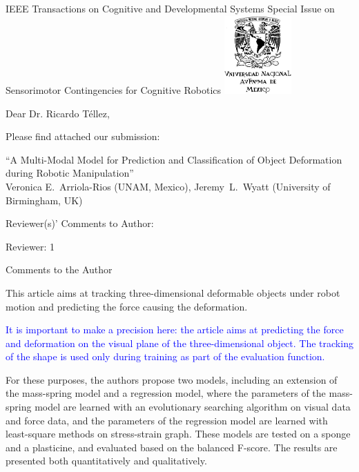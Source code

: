 \documentclass[a4paper,12pt]{letter}
\newcommand{\comment}[1]{\textcolor{blue}{#1}}
\begin{document}

\begin{letter}{IEEE Transactions on Cognitive and Developmental Systems\newline
Special Issue on Sensorimotor Contingencies for Cognitive Robotics}
\includegraphics[height=3cm, keepaspectratio=true]{figures/unam.jpg}\vspace*{-3cm}
\address{Facultad de Ciencias, \\Ciudad Universitaria,\\ UNAM, México, D.F.}

\opening{Dear Dr. Ricardo Téllez,}

Please find attached our submission:
\begin{center}
 ``A Multi-Modal Model for Prediction and Classification of Object Deformation during Robotic Manipulation'' \\
 Veronica E.~Arriola-Rios (UNAM, Mexico), Jeremy~L.~Wyatt (University of Birmingham, UK)
\end{center}

Reviewer(s)' Comments to Author: 

Reviewer: 1 

Comments to the Author 

This article aims at tracking three-dimensional deformable objects under robot motion and predicting the force causing the deformation.

\comment{It is important to make a precision here: the article aims at predicting the force and deformation on the visual plane of the three-dimensional object.  The tracking of the shape is used only during training as part of the evaluation function.}

For these purposes, the authors propose two models, including an extension of the mass-spring model and a regression model, where the parameters of the mass-spring model are learned with an evolutionary searching algorithm on visual data and force data, and the parameters of the regression model are learned with least-square methods on stress-strain graph. These models are tested on a sponge and a plasticine, and evaluated based on the balanced F-score. The results are presented both quantitatively and qualitatively. 


\end{letter}
\end{document}
